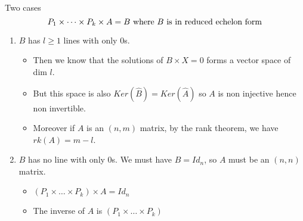 \documentclass{beamer}
\begin{document}
  \begin{frame}{Two cases}
    \[P_1 \times \dots \times P_k \times A = B \textnormal{ where } B \textnormal{ is in reduced echelon form}\]
    \begin{enumerate}
    \item $B$ has $l \ge 1$ lines with only $0$s.
      \begin{itemize}
      \item Then we know that the solutions of $B \times X = 0$ forms a vector space of dim $l$.
      \item But this space is also $Ker(\widehat{B}) = Ker(\widehat{A})$ so $A$ is non injective hence non invertible.
      \item Moreover if $A$ is an $(n,m)$ matrix, by the rank theorem, we have $rk(A) = m - l$.
      \end{itemize}
    \item $B$ has no line with only $0$s. We must have $B = Id_n$, so $A$ must be an $(n,n)$ matrix.
      \begin{itemize}
      \item $(P_1 \times \dots \times  P_k) \times A = Id_n$
      \item The inverse of $A$ is $(P_1 \times \dots \times  P_k)$
      \end{itemize}
    \end{enumerate}
      
  \end{frame}
  
\end{document}
